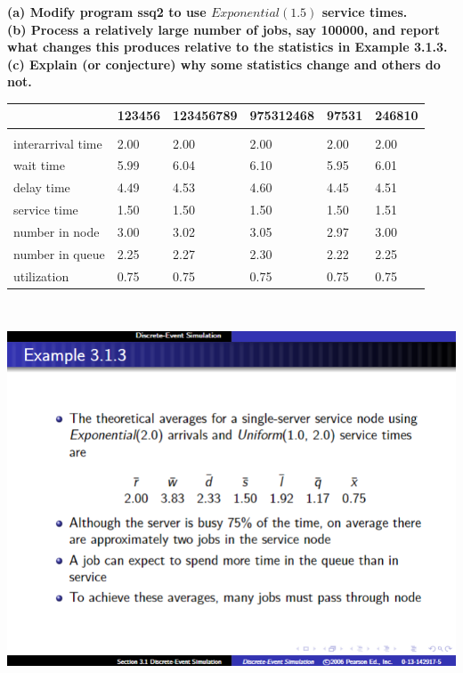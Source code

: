 \textbf{(a) Modify program ssq2 to use $Exponential(1.5)$ service times.}\\
\textbf{(b) Process a relatively large number of jobs, say 100000, and report what changes this produces relative to the statistics in Example 3.1.3.}\\
\textbf{(c) Explain (or conjecture) why some statistics change and others do not.}\\

\begin{table}[h]
\centering
\begin{tabular}{l|lllll}
                  & 123456 & 123456789 & 975312468 & 97531 & 246810 \\
                  \hline\\
interarrival time & 2.00   & 2.00      & 2.00      & 2.00  & 2.00   \\
wait time         & 5.99   & 6.04      & 6.10      & 5.95  & 6.01   \\
delay time        & 4.49   & 4.53      & 4.60      & 4.45  & 4.51   \\
service time      & 1.50   & 1.50      & 1.50      & 1.50  & 1.51   \\
number in node    & 3.00   & 3.02      & 3.05      & 2.97  & 3.00   \\
number in queue   & 2.25   & 2.27      & 2.30      & 2.22  & 2.25   \\
utilization       & 0.75   & 0.75      & 0.75      & 0.75  & 0.75  
\end{tabular}
\end{table}\\
\begin{center}
    \includegraphics[scale=0.75]{Sections/Q1/3.1.3.png}
\end{center}\\
